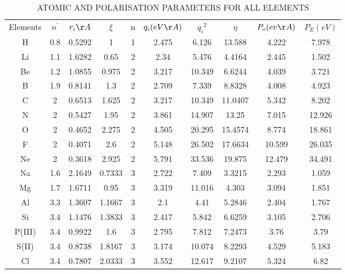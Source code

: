\documentclass[journal]{IEEEtran}
\begin{document}
\Large{
	\begin{longtable}{|c|c|c|c|c|c|c|c|c|c|}
		\caption{ATOMIC AND POLARISATION PARAMETERS FOR ALL ELEMENTS }
		
			\endfirsthead
		\endhead
		\hline
		
		Elements &  $n^{'}$   & $r_i \AA$    &$ \xi$      & n &  $q_i (eV \AA)$      &     ${q_i}^2$    & $\eta$      & $P_o (ev \AA)$ & $P_E (eV)$    \\
		H        & 0.8 & 0.5292 & 1      & 1 & 2.475  & 6.126   & 13.588  & 4.222  & 7.978   \\
		Li       & 1.1 & 1.6282 & 0.65   & 2 & 2.34   & 5.476   & 4.4164  & 2.445  & 1.502   \\
		Be       & 1.2 & 1.0855 & 0.975  & 2 & 3.217  & 10.349  & 6.6244  & 4.039  & 3.721   \\
		B        & 1.9 & 0.8141 & 1.3    & 2 & 2.709  & 7.339   & 8.8328  & 4.008  & 4.923   \\
		C        & 2   & 0.6513 & 1.625  & 2 & 3.217  & 10.349  & 11.0407 & 5.342  & 8.202   \\
		N        & 2   & 0.5427 & 1.95   & 2 & 3.861  & 14.907  & 13.25   & 7.015  & 12.926  \\
		O        & 2   & 0.4652 & 2.275  & 2 & 4.505  & 20.295  & 15.4574 & 8.774  & 18.861  \\
		F        & 2   & 0.4071 & 2.6    & 2 & 5.148  & 26.502  & 17.6634 & 10.599 & 26.035  \\
		Ne       & 2   & 0.3618 & 2.925  & 2 & 5.791  & 33.536  & 19.875  & 12.479 & 34.491  \\
		Na       & 1.6 & 2.1649 & 0.7333 & 3 & 2.722  & 7.409   & 3.3215  & 2.293  & 1.059   \\
		Mg       & 1.7 & 1.6711 & 0.95   & 3 & 3.319  & 11.016  & 4.303   & 3.094  & 1.851   \\
		Al       & 3.3 & 1.3607 & 1.1667 & 3 & 2.1    & 4.41    & 5.2846  & 2.404  & 1.767   \\
		Si       & 3.4 & 1.1476 & 1.3833 & 3 & 2.417  & 5.842   & 6.6259  & 3.105  & 2.706   \\
		P(III)   & 3.4 & 0.9922 & 1.6    & 3 & 2.795  & 7.812   & 7.2473  & 3.76   & 3.79    \\
		S(II)    & 3.4 & 0.8738 & 1.8167 & 3 & 3.174  & 10.074  & 8.2293  & 4.529  & 5.183   \\
		Cl       & 3.4 & 0.7807 & 2.0333 & 3 & 3.552  & 12.617  & 9.2107  & 5.324  & 6.82    \\

\end{longtable}}
\end{document}
